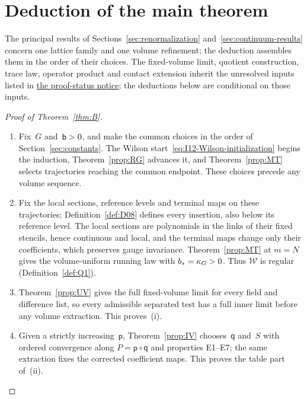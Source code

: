 \section{Deduction of the main theorem}\label{sec:deduction}

The principal results of Sections~\ref{sec:renormalization} and~\ref{sec:continuum-results} concern one lattice family and one volume refinement; the deduction assembles them in the order of their choices. The fixed-volume limit, quotient construction, trace law, operator product and contact extension inherit the unresolved inputs listed in \hyperref[par:proof-status]{the proof-status notice}; the deductions below are conditional on those inputs.

\begin{proof}[Proof of Theorem~\ref{thm:B}]
\begin{enumerate}[label=\textup{\arabic*.},ref=\arabic*,itemsep=0.25em]
\item\label{step:deduction-choice} Fix~$G$ and~$\mathsf{b}>0$, and make the common choices in the order of Section~\ref{sec:constants}. The Wilson start~\eqref{eq:I12-Wilson-initialization} begins the induction, Theorem~\ref{prop:RG} advances it, and Theorem~\ref{prop:MT} selects trajectories reaching the common endpoint. These choices precede any volume sequence.

\item\label{step:deduction-family} Fix the local sections, reference levels and terminal maps on these trajectories; Definition~\ref{def:D08} defines every insertion, also below its reference level. The local sections are polynomials in the links of their fixed stencils, hence continuous and local, and the terminal maps change only their coefficients, which preserves gauge invariance. Theorem~\ref{prop:MT} at $m=N$ gives the volume-uniform running law with $b_*=\kappa_G>0$. Thus $\mathcal W$ is regular (Definition~\ref{def:Q1}).

\item\label{step:deduction-uv} Theorem~\ref{prop:UV} gives the full fixed-volume limit for every field and difference list, so every admissible separated test has a full inner limit before any volume extraction. This proves~(i).

\item\label{step:deduction-volume} Given a strictly increasing~$\mathsf p$, Theorem~\ref{prop:IV} chooses~$\mathsf q$ and~$S$ with ordered convergence along $P=\mathsf p\circ\mathsf q$ and properties E1--E7; the same extraction fixes the corrected coefficient maps. This proves the table part of~(ii).


\end{enumerate}
\end{proof}

